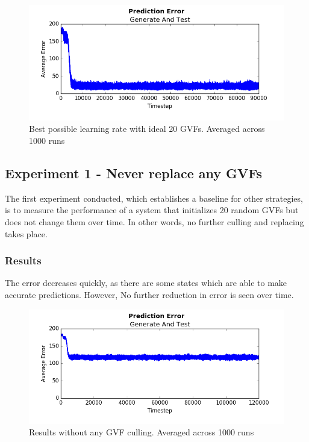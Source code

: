 \documentclass[letterpaper]{article}
\begin{document}
\begin{figure}[H]
  \centerline{\includegraphics[width = \linewidth]{Plots/AverageErrorBestPossibleWith20RealGVFS.png}}
  \caption{Best possible learning rate with ideal 20 GVFs. Averaged across 1000 runs}
  \label{fig:ideal}
\end{figure}

\subsection{Experiment 1 - Never replace any GVFs}
The first experiment conducted, which establishes a baseline for other strategies, is to measure the performance of a system that initializes 20 random GVFs but does not change them over time. In other words, no further culling and replacing takes place.  

\subsubsection{Results}

The error decreases quickly, as there are some states which are able to make accurate predictions. However, No further reduction in error is seen over time. 

\begin{figure}[H]
  \centerline{\includegraphics[width = \linewidth]{Plots/AverageErrorNoKulling.png}}
  \caption{Results without any GVF culling. Averaged across 1000 runs}
  \label{fig:experiment}
\end{figure}
\end{document}
